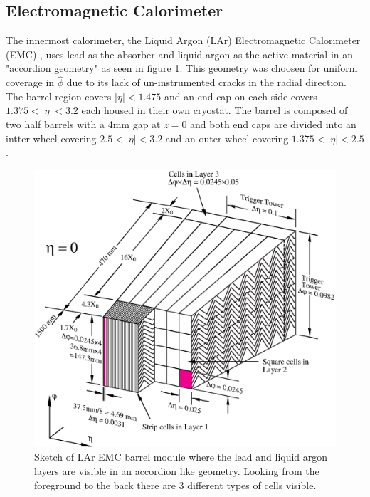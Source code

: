 \subsection{Electromagnetic Calorimeter}

The innermost calorimeter, the Liquid Argon (LAr) Electromagnetic Calorimeter
(EMC) \cite{PERF-2007-01}, uses lead as the absorber and liquid argon as
the active material in an "accordion geometry" as seen in figure
\ref{fig:accordion}. This geometry was choosen for uniform coverage in
$\hat{\phi}$ due to its lack of un-instrumented cracks in the radial direction.
The barrel region covers $|\eta| < 1.475$ and an end cap on each side covers
$1.375 < |\eta| < 3.2$ each housed in their own cryostat.  The barrel is
composed of two half barrels with a 4mm gap at $z = 0$ and both end caps are
divided into an intter wheel covering $2.5 < |\eta| < 3.2$ and an outer wheel
covering $1.375 < |\eta| < 2.5$.

\begin{figure}[!htbp]
  \begin{center}
    \includegraphics[width=0.8\linewidth]{figures/atlas/accordion}
    \caption{ \cite{PERF-2007-01} Sketch of LAr EMC barrel module where the lead
and liquid argon layers are visible in an accordion like geometry. Looking from
the foreground to the back there are 3 different types of cells visible.}
    \label{fig:accordion}
  \end{center}
\end{figure}

